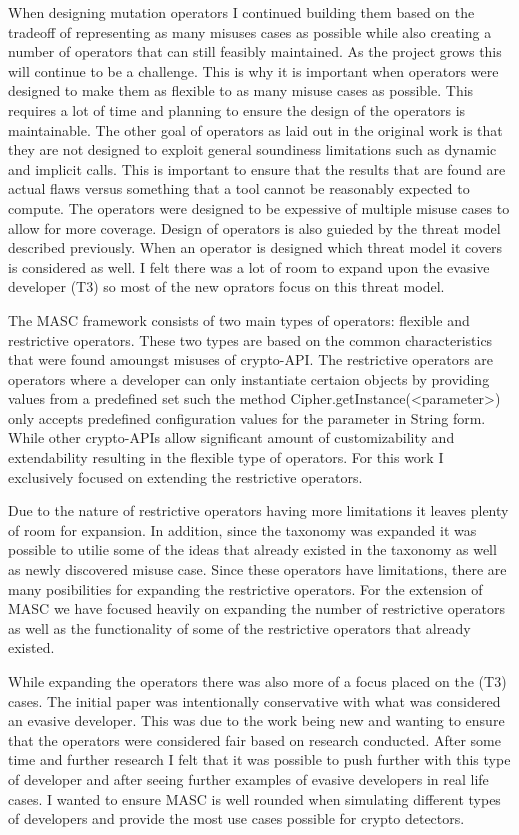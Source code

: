 When designing mutation operators I continued building them based on the tradeoff of representing as many misuses cases as possible while also creating a number of operators that can still feasibly maintained. As the project grows this will continue to be a challenge. This is why it is important when operators were designed to make them as flexible to as many misuse cases as possible. This requires a lot of time and planning to ensure the design of the operators is maintainable. The other goal of operators as laid out in the original work is that they are not designed to exploit general soundiness limitations such as dynamic and implicit calls. This is important to ensure that the results that are found are actual flaws versus something that a tool cannot be reasonably expected to compute. The operators were designed to be expessive of multiple misuse cases to allow for more coverage. Design of operators is also guieded by the threat model described previously. When an operator is designed which threat model it covers is considered as well. I felt there was a lot of room to expand upon the evasive developer (T3) so most of the new oprators focus on this threat model.

The MASC framework consists of two main types of operators: flexible and restrictive operators. These two types are based on the common characteristics that were found amoungst misuses of crypto-API. The restrictive operators are operators where a developer can only instantiate certaion objects by providing values from a predefined set such the method Cipher.getInstance(<parameter>) only accepts predefined configuration values for the parameter in String form. While other crypto-APIs allow significant amount of customizability and extendability resulting in the flexible type of operators. For this work I exclusively focused on extending the restrictive operators.

Due to the nature of restrictive operators having more limitations it leaves plenty of room for expansion. In addition, since the taxonomy was expanded it was possible to utilie some of the ideas that already existed in the taxonomy as well as newly discovered misuse case. Since these operators have limitations, there are many posibilities for expanding the restrictive operators. For the extension of MASC we have focused heavily on expanding the number of restrictive operators as well as the functionality of some of the restrictive operators that already existed.

While expanding the operators there was also more of a focus placed on the (T3) cases. The initial paper was intentionally conservative with what was considered an evasive developer. This was due to the work being new and wanting to ensure that the operators were considered fair based on research conducted. After some time and further research I felt that it was possible to push further with this type of developer and after seeing further examples of evasive developers in real life cases. I wanted to ensure MASC is well rounded when simulating different types of developers and provide the most use cases possible for crypto detectors.


